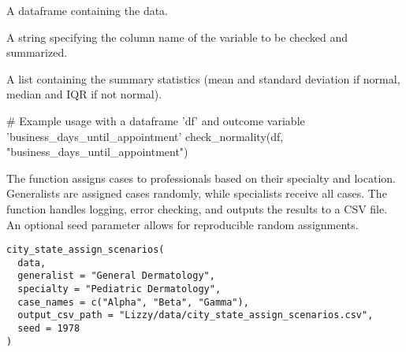 \documentclass[a4paper]{book}
\begin{document}
%
\begin{Arguments}
\begin{ldescription}
\item[\code{data}] A dataframe containing the data.

\item[\code{variable}] A string specifying the column name of the variable to be checked and summarized.
\end{ldescription}
\end{Arguments}
%
\begin{Value}
A list containing the summary statistics (mean and standard deviation if normal, median and IQR if not normal).
\end{Value}
%
\begin{Examples}
\begin{ExampleCode}
# Example usage with a dataframe 'df' and outcome variable 'business_days_until_appointment'
check_normality(df, "business_days_until_appointment")
\end{ExampleCode}
\end{Examples}
%
\begin{Description}
The  function assigns cases to professionals based on their specialty and location. Generalists are assigned cases randomly, while specialists receive all cases. The function handles logging, error checking, and outputs the results to a CSV file. An optional seed parameter allows for reproducible random assignments.
\end{Description}
%
\begin{Usage}
\begin{verbatim}
city_state_assign_scenarios(
  data,
  generalist = "General Dermatology",
  specialty = "Pediatric Dermatology",
  case_names = c("Alpha", "Beta", "Gamma"),
  output_csv_path = "Lizzy/data/city_state_assign_scenarios.csv",
  seed = 1978
)
\end{verbatim}
\end{Usage}
%
\end{document}
